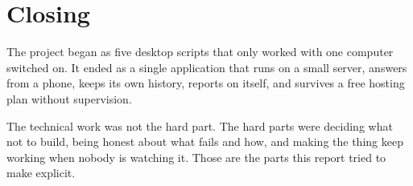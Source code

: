 \section{Closing}

The project began as five desktop scripts that only worked with one computer
switched on. It ended as a single application that runs on a small server,
answers from a phone, keeps its own history, reports on itself, and survives a
free hosting plan without supervision.

The technical work was not the hard part. The hard parts were deciding what not
to build, being honest about what fails and how, and making the thing keep
working when nobody is watching it. Those are the parts this report tried to
make explicit.
